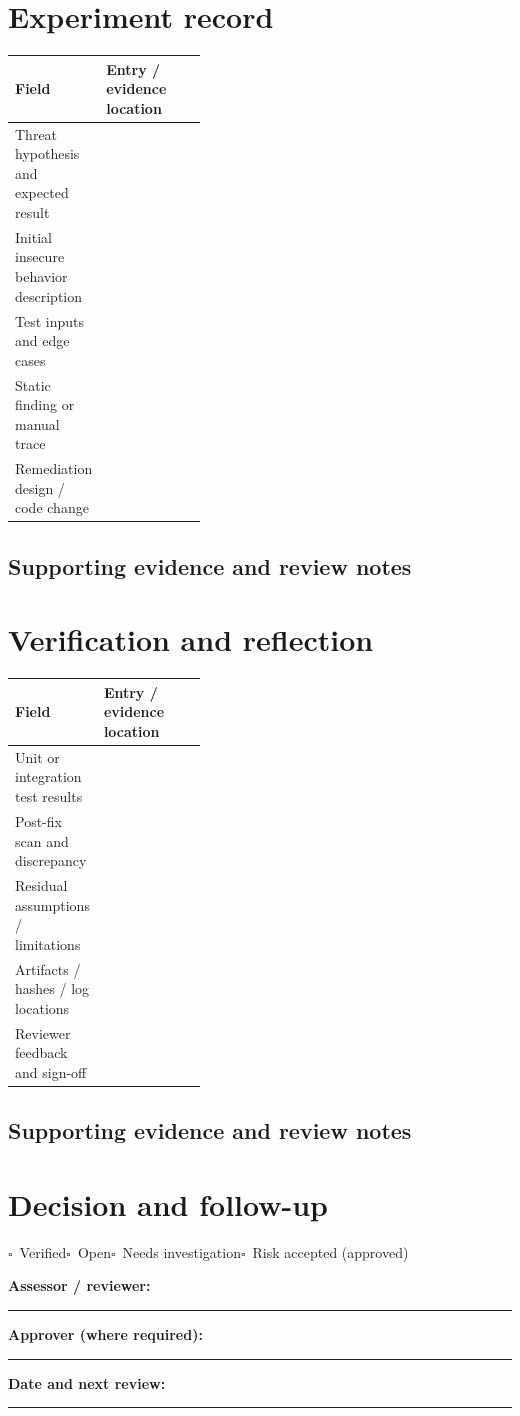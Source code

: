 \documentclass[10pt,letterpaper]{article}
\newcommand{\checkbox}{\(\square\)}
\newcommand{\blankline}{\noindent\rule{\linewidth}{0.35pt}\par\vspace{4pt}}
\newcommand{\writearea}[1]{\par\begin{tcolorbox}[colback=white,colframe=linegray,boxrule=0.5pt,height=#1,sharp corners]\mbox{}\end{tcolorbox}\par}
\begin{document}
\section{Experiment record}
\begin{tabularx}{\linewidth}{@{}p{0.38\linewidth}Y@{}}
\toprule Field & Entry / evidence location\\\midrule
Threat hypothesis and expected result & \\[1.0em]
\midrule
Initial insecure behavior description & \\[1.0em]
\midrule
Test inputs and edge cases & \\[1.0em]
\midrule
Static finding or manual trace & \\[1.0em]
\midrule
Remediation design / code change & \\[1.0em]
\midrule
\end{tabularx}
\subsection{Supporting evidence and review notes}
\writearea{1.45in}
\clearpage
\section{Verification and reflection}
\begin{tabularx}{\linewidth}{@{}p{0.38\linewidth}Y@{}}
\toprule Field & Entry / evidence location\\\midrule
Unit or integration test results & \\[1.0em]
\midrule
Post-fix scan and discrepancy & \\[1.0em]
\midrule
Residual assumptions / limitations & \\[1.0em]
\midrule
Artifacts / hashes / log locations & \\[1.0em]
\midrule
Reviewer feedback and sign-off & \\[1.0em]
\midrule
\end{tabularx}
\subsection{Supporting evidence and review notes}
\writearea{1.45in}
\clearpage
\section{Decision and follow-up}
\noindent\checkbox\ Verified\quad\checkbox\ Open\quad\checkbox\ Needs investigation\quad\checkbox\ Risk accepted (approved)\par
\noindent\textbf{Assessor / reviewer:}\par\blankline\textbf{Approver (where required):}\par\blankline\textbf{Date and next review:}\par\blankline
\writearea{1.7in}
\end{document}
